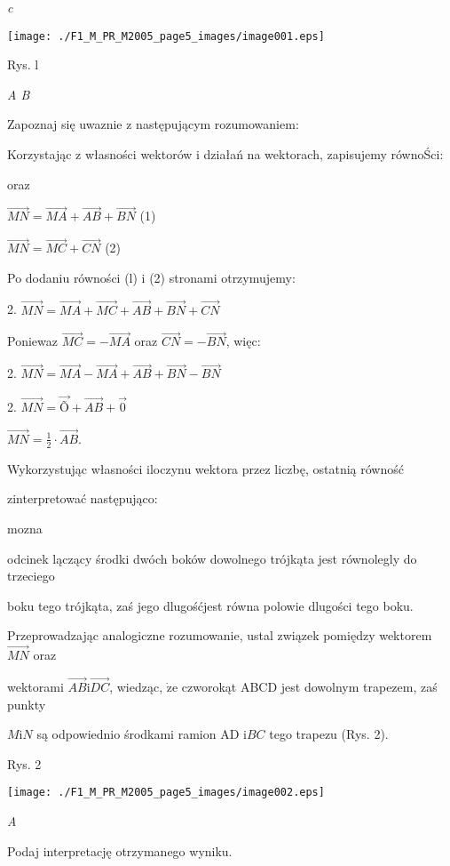 \documentclass[a4paper,12pt]{article}
\begin{document}
{\it c}
\begin{center}
\texttt{[image: ./F1\_M\_PR\_M2005\_page5\_images/image001.eps]}
\end{center}
Rys. l

{\it A  B}

Zapoznaj się uwaznie z następującym rozumowaniem:

Korzystając z własności wektorów i działań na wektorach, zapisujemy równoŚci:

oraz

$\vec{MN}=\vec{MA}+\vec{AB}+\vec{BN}$ (1)

$\vec{MN}=\vec{MC}+\vec{CN}$ (2)

Po dodaniu równości (l) $\mathrm{i}$ (2) stronami otrzymujemy:

2. $\vec{MN}=\vec{MA}+\vec{MC}+\vec{AB}+\vec{BN}+\vec{CN}$

Poniewaz $\vec{MC}=-\vec{MA}$ oraz $\vec{CN}=-\vec{BN}$, więc:

2. $\vec{MN}=\vec{MA}-\vec{MA}+\vec{AB}+\vec{BN}-\vec{BN}$

2. $\vec{MN}=\vec{\text{Õ}}+\vec{AB}+\vec{0}$

$\displaystyle \vec{MN}=\frac{1}{2}\cdot\vec{AB}.$

Wykorzystując własności iloczynu wektora przez liczbę, ostatnią równość

zinterpretować następująco:

mozna

odcinek lączący środki dwóch boków dowolnego trójkąta jest równolegly do trzeciego

boku tego trójkąta, zaś jego dlugośćjest równa polowie dlugości tego boku.

Przeprowadzając analogiczne rozumowanie, ustal związek pomiędzy wektorem $\vec{MN}$ oraz

wektorami $\vec{AB} \mathrm{i} \vec{DC}$, wiedząc, $\dot{\mathrm{z}}\mathrm{e}$ czworokąt ABCD jest dowolnym trapezem, zaś punkty

$M\mathrm{i}N$ są odpowiednio środkami ramion AD $\mathrm{i}BC$ tego trapezu (Rys. 2).

Rys. 2
\begin{center}
\texttt{[image: ./F1\_M\_PR\_M2005\_page5\_images/image002.eps]}
\end{center}
{\it A}

Podaj interpretację otrzymanego wyniku.
\end{document}
